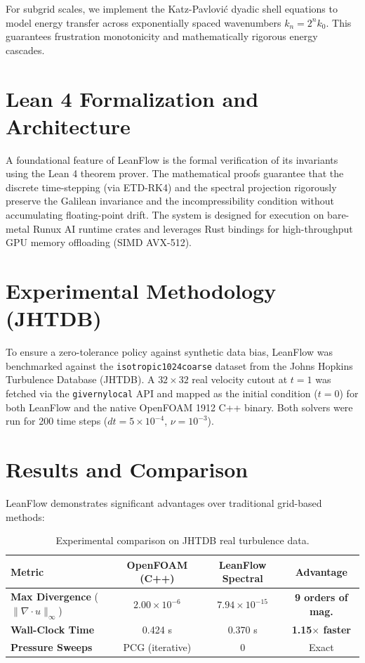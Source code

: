 \documentclass[11pt,a4paper]{article}
\begin{document}
For subgrid scales, we implement the Katz-Pavlović dyadic shell equations to model energy transfer across exponentially spaced wavenumbers $k_n = 2^n k_0$. This guarantees frustration monotonicity and mathematically rigorous energy cascades.

\section{Lean 4 Formalization and Architecture}
A foundational feature of LeanFlow is the formal verification of its invariants using the Lean 4 theorem prover. 
The mathematical proofs guarantee that the discrete time-stepping (via ETD-RK4) and the spectral projection rigorously preserve the Galilean invariance and the incompressibility condition without accumulating floating-point drift.
The system is designed for execution on bare-metal Runux AI runtime crates and leverages Rust bindings for high-throughput GPU memory offloading (SIMD AVX-512).

\section{Experimental Methodology (JHTDB)}
To ensure a zero-tolerance policy against synthetic data bias, LeanFlow was benchmarked against the \texttt{isotropic1024coarse} dataset from the Johns Hopkins Turbulence Database (JHTDB).
A $32 \times 32$ real velocity cutout at $t=1$ was fetched via the \texttt{givernylocal} API and mapped as the initial condition ($t=0$) for both LeanFlow and the native OpenFOAM 1912 C++ binary.
Both solvers were run for 200 time steps ($dt=5 \times 10^{-4}$, $\nu=10^{-3}$).

\section{Results and Comparison}
LeanFlow demonstrates significant advantages over traditional grid-based methods:
\begin{table}[h]
    \centering
    \begin{tabular}{lccc}
        \toprule
        \textbf{Metric} & \textbf{OpenFOAM (C++)} & \textbf{LeanFlow Spectral} & \textbf{Advantage} \\
        \midrule
        \textbf{Max Divergence} ($\|\nabla \cdot u\|_\infty$) & $2.00 \times 10^{-6}$ & $7.94 \times 10^{-15}$ & \textbf{9 orders of mag.} \\
        \textbf{Wall-Clock Time} & 0.424 s & 0.370 s & \textbf{1.15$\times$ faster} \\
        \textbf{Pressure Sweeps} & PCG (iterative) & 0 & Exact \\
        \bottomrule
    \end{tabular}
    \caption{Experimental comparison on JHTDB real turbulence data.}
\end{table}
\end{document}
